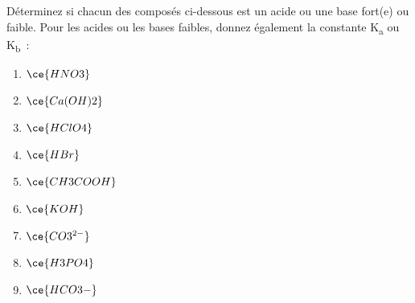 \documentclass[
  11pt,
  a4paper,
  openany]{book}
\providecommand{\tightlist}{%
  \setlength{\itemsep}{0pt}\setlength{\parskip}{0pt}}
\begin{document}
\begin{Exercise}

Déterminez si chacun des composés ci-dessous est un acide ou une base fort(e) ou faible. Pour les acides ou les bases faibles, donnez également la constante K\textsubscript{a} ou K\textsubscript{b}~:

\begin{enumerate}
\def\labelenumi{\alph{enumi}.}
\tightlist
\item
  \(\ce{HNO3}\)
\item
  \(\ce{Ca(OH)2}\)
\item
  \(\ce{HClO4}\)
\item
  \(\ce{HBr}\)
\item
  \(\ce{CH3COOH}\)
\item
  \(\ce{KOH}\)
\item
  \(\ce{CO3^{2-}}\)
\item
  \(\ce{H3PO4}\)
\item
  \(\ce{HCO3-}\)
\end{enumerate}

\end{Exercise}
\end{document}
